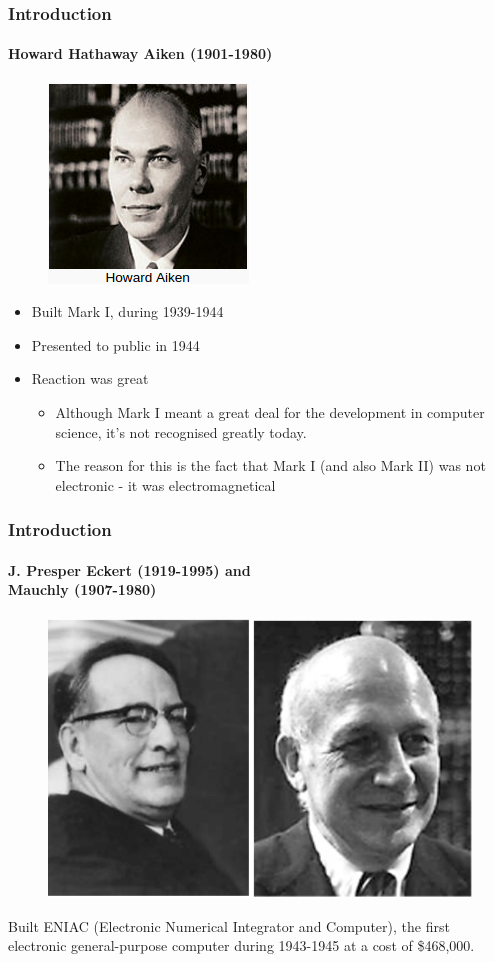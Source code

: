 \documentclass[hyperref={pdfpagelabels=true}]{beamer}
\begin{document}
\begin{frame}
\frametitle{Introduction}
\framesubtitle{Howard Hathaway Aiken (1901-1980)}
\begin{figure}[!tbp]
\centering
\includegraphics[scale = 0.5]{figs/Selection_01b2.png}
\end{figure}
\begin{itemize}
\item Built Mark I, during 1939-1944
\item Presented to public in 1944
\item Reaction was great
\begin{itemize}
\item Although Mark I meant a great deal for the development in
computer science, it's not recognised greatly today.
\item The reason for this is the fact that Mark I (and also Mark
II) was not electronic - it was electromagnetical
\end{itemize}
\end{itemize}
\end{frame}

\begin{frame}
\frametitle{Introduction}
\framesubtitle{J. Presper Eckert (1919-1995) and \\ Mauchly (1907-1980)}
\begin{figure}[!tbp]
\centering
\includegraphics[scale = 0.31]{figs/Selection_01c2.png}
\end{figure}
Built ENIAC (Electronic Numerical Integrator and Computer), the first
electronic general-purpose computer during 1943-1945 at a cost of
\$468,000.
\end{frame}
\end{document}
